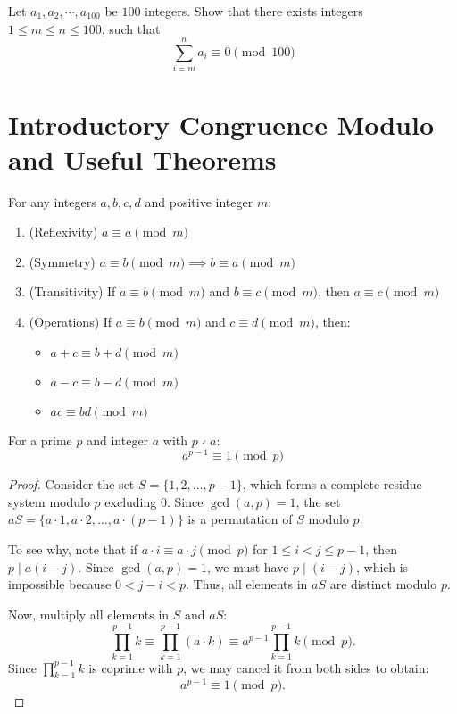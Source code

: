 \documentclass{scrartcl} %
\begin{document}
\begin{example}
	Let $a_1, a_2,\cdots, a_{100}$ be $100$ integers. Show that there exists integers $1 \leq m \leq n \leq 100$, such that\[\sum\limits_{i = m}^{n} a_i \equiv 0 \pmod{100} \]
\end{example}
\newpage
\section{Introductory Congruence Modulo and Useful Theorems}

\begin{theorem}
For any integers $a,b,c,d$ and positive integer $m$:
\begin{enumerate}
    \item (Reflexivity) $a \equiv a \pmod{m}$
    \item (Symmetry) $a \equiv b \pmod{m} \implies b \equiv a \pmod{m}$
    \item (Transitivity) If $a \equiv b \pmod{m}$ and $b \equiv c \pmod{m}$, then $a \equiv c \pmod{m}$
    \item (Operations) If $a \equiv b \pmod{m}$ and $c \equiv d \pmod{m}$, then:
    \begin{itemize}
        \item $a+c \equiv b+d \pmod{m}$
        \item $a-c \equiv b-d \pmod{m}$
        \item $ac \equiv bd \pmod{m}$
    \end{itemize}
\end{enumerate}
\end{theorem}

\begin{theorem}\label{thm:fermatslittletheorem}
For a prime $p$ and integer $a$ with $p \nmid a$:
\[ a^{p-1} \equiv 1 \pmod{p} \]
\end{theorem}

\begin{proof}
Consider the set $S = \{1, 2, \ldots, p-1\}$, which forms a complete residue system modulo $p$ excluding $0$. Since $\gcd(a, p) = 1$, the set $aS = \{a \cdot 1, a \cdot 2, \ldots, a \cdot (p-1)\}$ is a permutation of $S$ modulo $p$. 

To see why, note that if $a \cdot i \equiv a \cdot j \pmod{p}$ for $1 \leq i < j \leq p-1$, then $p \mid a(i-j)$. Since $\gcd(a, p) = 1$, we must have $p \mid (i-j)$, which is impossible because $0 < j-i < p$. Thus, all elements in $aS$ are distinct modulo $p$.

Now, multiply all elements in $S$ and $aS$:
\[
\prod_{k=1}^{p-1} k \equiv \prod_{k=1}^{p-1} (a \cdot k) \equiv a^{p-1} \prod_{k=1}^{p-1} k \pmod{p}.
\]
Since $\prod_{k=1}^{p-1} k$ is coprime with $p$, we may cancel it from both sides to obtain:
\[
a^{p-1} \equiv 1 \pmod{p}.
\]
\end{proof}
\newpage
\end{document}
